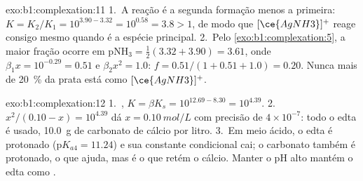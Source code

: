 \begin{solution}{exo:b1:complexation:11}
1.~A reação é a segunda formação menos a primeira: $K = K_2/K_1 =
10^{3.90 - 3.32} = 10^{0.58} = 3.8 > 1$, de modo que $[\ce{AgNH3}]^{+}$
reage consigo mesmo quando é a espécie principal.
2.~Pelo \cref{exo:b1:complexation:5}, a maior fração ocorre em
$\mathrm{pNH_3} = \frac12(3.32 + 3.90) = 3.61$, onde $\beta_1 x = 10^{-0.29}
= 0.51$ e $\beta_2x^2 = 1.0$: $f = 0.51/(1 + 0.51 + 1.0) = 0.20$. Nunca
mais de \qty{20}{\percent} da prata está como $[\ce{AgNH3}]^{+}$.
\end{solution}

\begin{solution}{exo:b1:complexation:12}
1.~, $K = \beta K_s = 10^{12.69 -
8.30} = 10^{4.39}$.
2.~$x^2/(0.10 - x) = 10^{4.39}$ dá $x = \qty{0.10}{mol/L}$ com precisão de
$4 \times 10^{-7}$: todo o edta é usado, \qty{10.0}{g} de carbonato de
cálcio por litro.
3.~Em meio ácido, o edta é protonado ($\mathrm{p}K_{a4} = 11.24$) e sua
constante condicional cai; o carbonato também é protonado, o que ajuda,
mas é o  que retém o cálcio. Manter o pH alto mantém o edta como
.
\end{solution}

